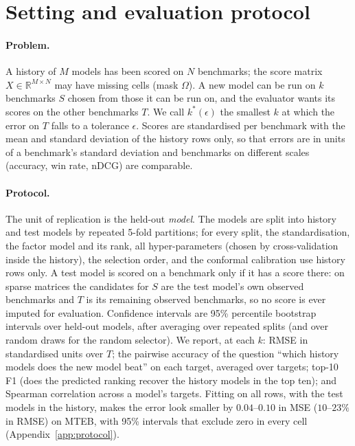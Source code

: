 \section{Setting and evaluation protocol}
\label{sec:setting}
\paragraph{Problem.}
A history of $M$ models has been scored on $N$ benchmarks; the score matrix $X\in\mathbb{R}^{M\times N}$ may have missing cells (mask $\Omega$).
A new model can be run on $k$ benchmarks $S$ chosen from those it can be run on, and the evaluator wants its scores on the other benchmarks $T$.
We call $k^\ast(\epsilon)$ the smallest $k$ at which the error on $T$ falls to a tolerance $\epsilon$.
Scores are standardised per benchmark with the mean and standard deviation of the history rows only, so that errors are in units of a benchmark's standard deviation and benchmarks on different scales (accuracy, win rate, nDCG) are comparable.

\paragraph{Protocol.}
The unit of replication is the held-out \emph{model}.
The models are split into history and test models by repeated 5-fold partitions; for every split, the standardisation, the factor model and its rank, all hyper-parameters (chosen by cross-validation inside the history), the selection order, and the conformal calibration use history rows only.
A test model is scored on a benchmark only if it has a score there: on sparse matrices the candidates for $S$ are the test model's own observed benchmarks and $T$ is its remaining observed benchmarks, so no score is ever imputed for evaluation.
Confidence intervals are 95\% percentile bootstrap intervals over held-out models, after averaging over repeated splits (and over random draws for the random selector).
We report, at each $k$: RMSE in standardised units over $T$; the pairwise accuracy of the question ``which history models does the new model beat'' on each target, averaged over targets; top-10 F1 (does the predicted ranking recover the history models in the top ten); and Spearman correlation across a model's targets.
Fitting on all rows, with the test models in the history, makes the error look smaller by $0.04$--$0.10$ in MSE ($10$--$23\%$ in RMSE) on MTEB, with 95\% intervals that exclude zero in every cell (Appendix~\ref{app:protocol}).

